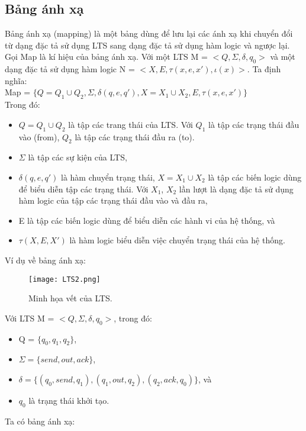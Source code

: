 \documentclass[a4paper,13pt,oneside,openany]{book}
\begin{document}
\begin{flushleft}
		\section{Bảng ánh xạ}
		Bảng ánh xạ (mapping) là một bảng dùng để lưu lại các ánh xạ khi chuyển đổi từ dạng đặc tả sử dụng LTS sang dạng đặc tả sử dụng hàm logic và ngược lại.\\
		Gọi Map là kí hiệu của bảng ánh xạ. Với một LTS M = $<Q, \Sigma, \delta, q_{0}>$ và một dạng đặc tả sử dụng hàm logic N = $<X, E, \tau(x, e, x'), \iota(x)>$. Ta định nghĩa:\\
		Map = $\{Q = Q_1 \cup Q_2, \Sigma, \delta(q, e, q'), X = X_1 \cup X_2, E, \tau(x, e, x')\}$\\
		Trong đó:\\
		\begin{itemize}
			\item $Q = Q_1 \cup Q_2$ là tập các trang thái của LTS. Với $Q_1$ là tập các trạng thái đầu vào (from), $Q_2$ là tập các trạng thái đầu ra (to).\\
			\item $\Sigma$ là tập các sự kiện của LTS,
			\item $\delta(q, e, q')$ là hàm chuyển trạng thái, $X = X_1 \cup X_2$ là tập các biến logic dùng để biểu diễn tập các trạng thái. Với $X_1$, $X_2$ lần lượt là dạng đặc tả sử dụng hàm logic của tập các trạng thái đầu vào và đầu ra,
			\item E là tập các biến logic dùng để biểu diễn các hành vi của hệ thống, và
			\item $\tau(X, E, X')$ là hàm logic biểu diễn việc chuyển trạng thái của hệ thống.\\
		\end{itemize}
		Ví dụ về bảng ánh xạ:
		\begin{figure}[h]
			\centering
			\texttt{[image: LTS2.png]}
			\caption{Minh họa vết của LTS.}
			\label{fig:LTS3}
		\end{figure}
		Với LTS M = $<Q, \Sigma, \delta, q_{0}>$, trong đó:
		\begin{itemize}
			\item Q = $\{q_0, q_1, q_2\}$,
			\item $\Sigma = \{send, out, ack\}$,
			\item $\delta = \{(q_0, send, q_1), (q_1, out, q_2), (q_2, ack, q_0)\}$, và
			\item $q_0$ là trạng thái khởi tạo.
		\end{itemize}
		Ta có bảng ánh xạ:
		\begin{table}[!ht]

\end{table}
\end{flushleft}
\end{document}
